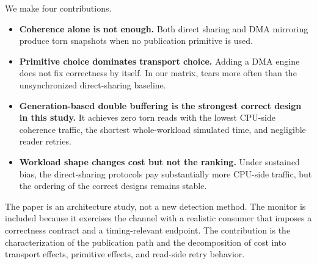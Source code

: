 We make four contributions.
\begin{itemize}
  \item \textbf{Coherence alone is not enough.} Both direct sharing and
    DMA mirroring produce torn snapshots when no publication primitive is
    used.
  \item \textbf{Primitive choice dominates transport choice.} Adding a
    DMA engine does not fix correctness by itself. In our matrix,
    \dmanaive tears more often than the unsynchronized direct-sharing
    baseline.
  \item \textbf{Generation-based double buffering is the strongest
    correct design in this study.} It achieves zero torn reads with the
    lowest CPU-side coherence traffic, the shortest whole-workload
    simulated time, and negligible reader retries.
  \item \textbf{Workload shape changes cost but not the ranking.} Under
    sustained bias, the direct-sharing protocols pay substantially more
    CPU-side traffic, but the ordering of the correct designs remains
    stable.
\end{itemize}

The paper is an architecture study, not a new detection method. The
monitor is included because it exercises the channel with a realistic
consumer that imposes a correctness contract and a timing-relevant
endpoint. The contribution is the characterization of the publication
path and the decomposition of cost into transport effects, primitive
effects, and read-side retry behavior.
